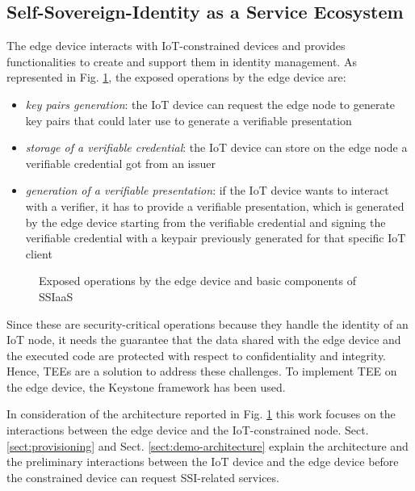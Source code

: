 \subsection{Self-Sovereign-Identity as a Service Ecosystem}
\label{sec:SSIaaS-ecosystem}
The edge device interacts with IoT-constrained devices and provides functionalities to create and support them in identity management. As represented in Fig. \ref{poc-design}, the exposed operations by the edge device are:
\begin{itemize}
    \item \textit{key pairs generation}: the IoT device can request the edge node to generate key pairs that could later use to generate a verifiable presentation
    \item \textit{storage of a verifiable credential}: the IoT device can store on the edge node a verifiable credential got from an issuer
    \item \textit{generation of a verifiable presentation}: if the IoT device wants to interact with a verifier, it has to provide a verifiable presentation, which is generated by the edge device starting from the verifiable credential and signing the verifiable credential with a keypair previously generated for that specific IoT client
\end{itemize}

\begin{figure}[H]
    \centering
    
    \caption{Exposed operations by the edge device and basic components of SSIaaS}
    \label{poc-design}
\end{figure}

Since these are security-critical operations because they handle the identity of an IoT node, it needs the guarantee that the data shared with the edge device and the executed code are protected with respect to confidentiality and integrity. 
Hence, TEEs are a solution to address these challenges. To implement TEE on the edge device, the Keystone framework has been used. 

In consideration of the architecture reported in Fig. \ref{poc-design} this work focuses on the interactions between the edge device and the IoT-constrained node. 
Sect. \ref{sect:provisioning} and Sect. \ref{sect:demo-architecture} explain the architecture and the preliminary interactions between the IoT device and the edge device before the constrained device can request SSI-related services. 



